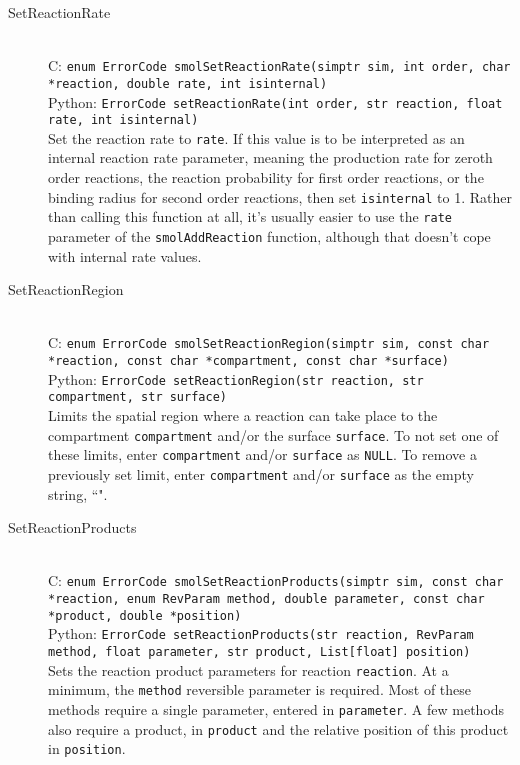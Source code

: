 \documentclass {book}
\newcommand {\ttt} {\texttt}
\begin{document}
\begin{description}
\item[SetReactionRate]
\hfill \\
C: \ttt{enum ErrorCode smolSetReactionRate(simptr sim, int order, char *reaction, double rate, int isinternal)}\\
Python: \ttt{ErrorCode setReactionRate(int order, str reaction, float rate, int isinternal)}\\
Set the reaction rate to \ttt{rate}. If this value is to be interpreted as an internal reaction rate parameter, meaning the production rate for zeroth order reactions, the reaction probability for first order reactions, or the binding radius for second order reactions, then set \ttt{isinternal} to 1. Rather than calling this function at all, it's usually easier to use the \ttt{rate} parameter of the \ttt{smolAddReaction} function, although that doesn't cope with internal rate values.

\item[SetReactionRegion]
\hfill \\
C: \ttt{enum ErrorCode smolSetReactionRegion(simptr sim, const char *reaction, const char *compartment, const char *surface)}\\
Python: \ttt{ErrorCode setReactionRegion(str reaction, str compartment, str surface)}\\
Limits the spatial region where a reaction can take place to the compartment \ttt{compartment} and/or the surface \ttt{surface}. To not set one of these limits, enter \ttt{compartment} and/or \ttt{surface} as \ttt{NULL}. To remove a previously set limit, enter \ttt{compartment} and/or \ttt{surface} as the empty string, ``".

\item[SetReactionProducts]
\hfill \\
C: \ttt{enum ErrorCode smolSetReactionProducts(simptr sim, const char *reaction, enum RevParam method, double parameter, const char *product, double *position)}\\
Python: \ttt{ErrorCode setReactionProducts(str reaction, RevParam method, float parameter, str product, List[float] position)}\\
Sets the reaction product parameters for reaction \ttt{reaction}. At a minimum, the \ttt{method} reversible parameter is required. Most of these methods require a single parameter, entered in \ttt{parameter}. A few methods also require a product, in \ttt{product} and the relative position of this product in \ttt{position}.


\end{description}
\end{document}
